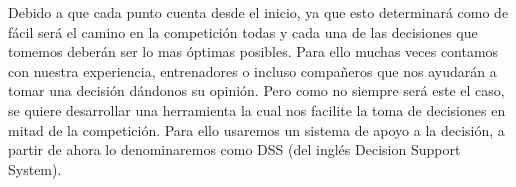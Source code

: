 Debido a que cada punto cuenta desde el inicio, ya que esto determinará como de fácil será el camino en la competición
todas y cada una de las decisiones que tomemos deberán ser lo mas óptimas posibles. Para ello muchas veces contamos
con nuestra experiencia, entrenadores o incluso compañeros que nos ayudarán a tomar una decisión dándonos su opinión.
Pero como no siempre será este el caso, se quiere desarrollar una herramienta la cual nos facilite la toma de
decisiones en mitad de la competición. Para ello usaremos un sistema de apoyo a la decisión, a partir de ahora
lo denominaremos como DSS (del inglés Decision Support System).
